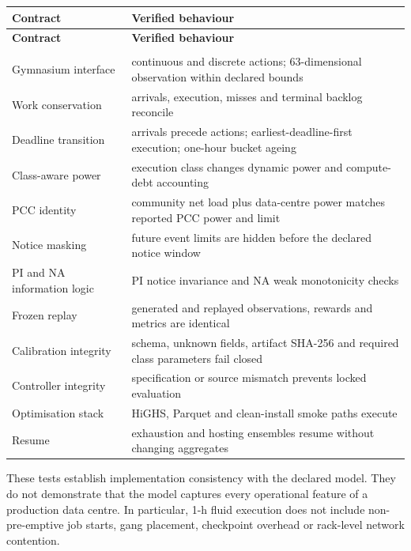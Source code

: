 \documentclass[10pt,a4paper]{article}
\begin{document}
{\footnotesize
\renewcommand{\arraystretch}{1.12}
\begin{longtable}{@{}>{\RaggedRight\arraybackslash}p{}>{\RaggedRight\arraybackslash}p{}@{}}
\toprule
\textbf{Contract} & \textbf{Verified behaviour} \\
\midrule
\endfirsthead
\toprule
\textbf{Contract} & \textbf{Verified behaviour} \\
\midrule
\endhead
\midrule \multicolumn{2}{r}{\scriptsize continued on next page} \\
\endfoot
\bottomrule
\endlastfoot
Gymnasium interface & continuous and discrete actions; 63-dimensional observation within declared bounds \\
Work conservation & arrivals, execution, misses and terminal backlog reconcile \\
Deadline transition & arrivals precede actions; earliest-deadline-first execution; one-hour bucket ageing \\
Class-aware power & execution class changes dynamic power and compute-debt accounting \\
PCC identity & community net load plus data-centre power matches reported PCC power and limit \\
Notice masking & future event limits are hidden before the declared notice window \\
PI and NA information logic & PI notice invariance and NA weak monotonicity checks \\
Frozen replay & generated and replayed observations, rewards and metrics are identical \\
Calibration integrity & schema, unknown fields, artifact SHA-256 and required class parameters fail closed \\
Controller integrity & specification or source mismatch prevents locked evaluation \\
Optimisation stack & HiGHS, Parquet and clean-install smoke paths execute \\
Resume & exhaustion and hosting ensembles resume without changing aggregates \\
\end{longtable}
}

These tests establish implementation consistency with the declared model. They do not demonstrate that the model captures every operational feature of a production data centre. In particular, 1-h fluid execution does not include non-pre-emptive job starts, gang placement, checkpoint overhead or rack-level network contention.
\end{document}
